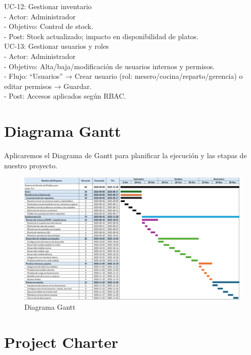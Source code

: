 \documentclass{article}
\begin{document}
\begin{doublespace}
    UC-12: Gestionar inventario\\
    - Actor: Administrador\\
    - Objetivo: Control de stock.\\
    - Post: Stock actualizado; impacto en disponibilidad de platos.\\

    UC-13: Gestionar usuarios y roles\\
    - Actor: Administrador\\
    - Objetivo: Alta/baja/modificación de usuarios internos y permisos.\\
    - Flujo: “Usuarios” → Crear usuario (rol: mesero/cocina/reparto/gerencia) o editar permisos → Guardar.\\
    - Post: Accesos aplicados según RBAC.\\

\section{Diagrama Gantt}
    \noindent Aplicaremos el Diagrama de Gantt para planificar la ejecución y las etapas de nuestro proyecto.
    \begin{figure}[H]
        \centering
        \vspace*{1cm}
        \includegraphics[width=14cm]{Gantt, WBS, Project Charter, BPM/gantt.png}
        \caption{Diagrama Gantt}
        \label{fig:Diagrama-gantt}
    \end{figure}

\section{Project Charter}


\end{doublespace}
\end{document}
